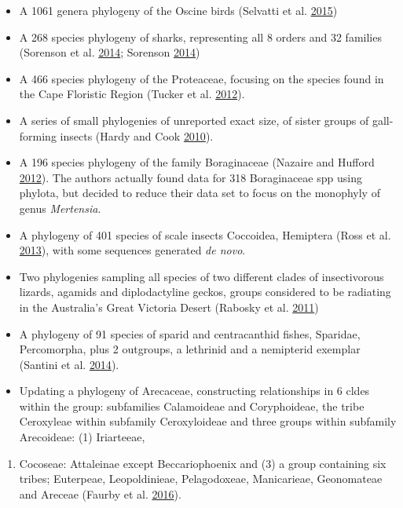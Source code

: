 \documentclass[]{article}
\providecommand{\tightlist}{%
  \setlength{\itemsep}{0pt}\setlength{\parskip}{0pt}}
\begin{document}
\begin{enumerate}
\begin{itemize}
  \item
    A 1061 genera phylogeny of the Oscine birds (Selvatti et al. \protect\hyperlink{ref-selvatti2015paleogene}{2015})
  \item
    A 268 species phylogeny of sharks, representing all 8 orders and 32 families (Sorenson et al. \protect\hyperlink{ref-sorenson2014effect}{2014}; Sorenson \protect\hyperlink{ref-sorenson2014evolution}{2014})
  \item
    A 466 species phylogeny of the Proteaceae, focusing on the species found in the Cape Floristic Region (Tucker et al. \protect\hyperlink{ref-tucker2012incorporating}{2012}).
  \item
    A series of small phylogenies of unreported exact size, of sister groups of gall-forming insects (Hardy and Cook \protect\hyperlink{ref-hardy2010gall}{2010}).
  \item
    A 196 species phylogeny of the family Boraginaceae (Nazaire and Hufford \protect\hyperlink{ref-nazaire2012broad}{2012}). The authors
    actually found data for 318 Boraginaceae spp using phylota, but decided to reduce
    their data set to focus on the monophyly of genus \emph{Mertensia}.
  \item
    A phylogeny of 401 species of scale insects Coccoidea, Hemiptera (Ross et al. \protect\hyperlink{ref-ross2013large}{2013}),
    with some sequences generated \emph{de novo}.
  \item
    Two phylogenies sampling all species of two different clades of insectivorous
    lizards, agamids and diplodactyline geckos, groups considered to be radiating
    in the Australia's Great Victoria Desert (Rabosky et al. \protect\hyperlink{ref-rabosky2011species}{2011})
  \item
    A phylogeny of 91 species of sparid and centracanthid fishes, Sparidae, Percomorpha,
    plus 2 outgroups, a lethrinid and a nemipterid exemplar (Santini et al. \protect\hyperlink{ref-santini2014first}{2014}).
  \item
    Updating a phylogeny of Arecaceae, constructing relationships in 6 cldes within
    the group: subfamilies Calamoideae and Coryphoideae, the tribe Ceroxyleae within
    subfamily Ceroxyloideae and three groups within subfamily Arecoideae: (1) Iriarteeae,
  \end{itemize}

  \begin{enumerate}
  \def\labelenumii{(\arabic{enumii})}
  \setcounter{enumii}{1}
  \tightlist
  \item
    Cocoseae: Attaleinae except Beccariophoenix and (3) a group containing six
    tribes; Euterpeae, Leopoldinieae, Pelagodoxeae, Manicarieae, Geonomateae and Areceae
    (Faurby et al. \protect\hyperlink{ref-faurby2016all}{2016}).
  \end{enumerate}


\end{enumerate}
\end{document}
